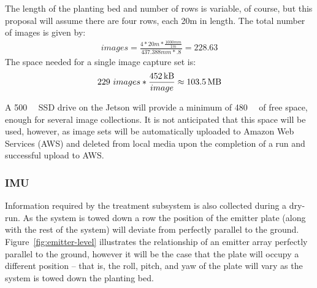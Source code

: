 \documentclass[12pt]{article}
\begin{document}
The length of the planting bed and number of rows is variable, of course, but this proposal will assume there are four rows, each 20m in length. The total number of images is given by:
\begin{align}
	images = \frac {4 * 20m * \frac{1000mm} {1m}} {437.388mm * .8} = 228.63
\end{align}
The space needed for a single image capture set is:
\begin{align}
229\ images * \frac{\SI{452}{\kilo\byte}} {image} \approx \SI{103.5}{\mega\byte}
\end{align}

A \SI{500}{\giga\byte} SSD drive on the Jetson will provide a minimum of \SI{480}{\giga\byte} of free space, enough for several image collections. It is not anticipated that this space will be used, however, as image sets will be automatically uploaded to Amazon Web Services (AWS) and deleted from local media upon the completion of a run and successful upload to AWS.

\subsubsection{IMU}

Information required by the treatment subsystem is also collected during a dry-run.  As the system is towed down a row the position of the emitter plate (along with the rest of the system) will deviate from perfectly parallel to the ground. Figure~\ref{fig:emitter-level} illustrates the relationship of an emitter array perfectly parallel to the ground, however it will be the case that the plate will occupy a different position -- that is, the roll, pitch, and yaw of the plate will vary as the system is towed down the planting bed.
\end{document}
